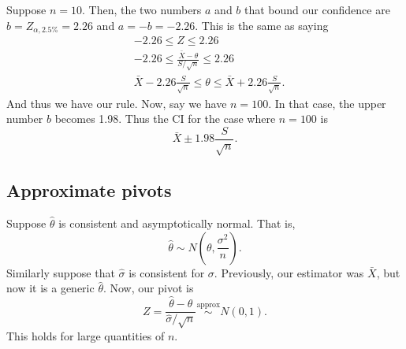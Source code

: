 \documentclass[titlepage, 12pt, leqno]{article}
\begin{document}
Suppose $n=10$. Then, the two numbers $a$ and $b$ that bound our confidence are
$b = Z_{\alpha, 2.5\%} = 2.26$ and $a = -b = -2.26$. This is the same as saying
\begin{align*}
    &-2.26 \le Z \le 2.26 \\
    &-2.26 \le \frac{\bar X - \theta}{S/\sqrt{n}} \le 2.26 \\
    &\bar X - 2.26\frac{S}{\sqrt{n}} \le \theta \le \bar X + 2.26
    \frac{S}{\sqrt{n}}.
\end{align*}
And thus we have our rule. Now, say we have $n=100$. In that case, the upper
number $b$ becomes 1.98. Thus the CI for the case where $n=100$ is
\[
    \bar X \pm 1.98 \frac{S}{\sqrt{n}}.
\]
\subsection{Approximate pivots}
Suppose $\hat \theta$ is consistent and asymptotically normal. That is,
\[
\hat \theta \sim N\left(\theta, \frac{\sigma^2}{n}\right).
\]
Similarly suppose that $\hat \sigma$ is consistent for $\sigma$. Previously,
our estimator was $\bar X$, but now it is a generic $\hat \theta$. Now, our
pivot is
\[
Z = \frac{\hat \theta - \theta}{\hat \sigma/\sqrt{n}} \overset{\mathrm{
approx}}{\sim} N(0,1).
\]
This holds for large quantities of $n$.
\end{document}
